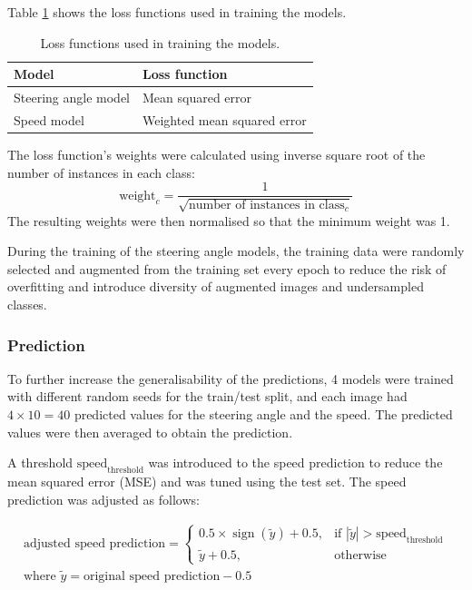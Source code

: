 \documentclass{article}
\begin{document}
Table \ref{tab:loss_functions} shows the loss functions used in training the models.

\begin{table}[h]
  \centering
  \renewcommand{\arraystretch}{1.2}
  \begin{tabular}{|l|l|}
    \hline
    \textbf{Model}       & \textbf{Loss function}      \\
    \hline
    Steering angle model & Mean squared error          \\
    Speed model          & Weighted mean squared error \\
    \hline
  \end{tabular}
  \vspace{0.5em}
  \caption{Loss functions used in training the models.}
  \label{tab:loss_functions}
\end{table}

The loss function's weights were calculated using inverse square root of the number of instances in each class:
\begin{equation}
  \text{weight}_c = \frac{1}{\sqrt{\text{number of instances in class}_c}}
  \label{eq:inverse_square_root}
\end{equation}
The resulting weights were then normalised so that the minimum weight was 1.

During the training of the steering angle models, the training data were randomly selected and augmented from the training set every epoch to reduce the risk of overfitting and introduce diversity of augmented images and undersampled classes.


\subsubsection{Prediction}
To further increase the generalisability of the predictions, 4 models were trained with different random seeds for the train/test split, and each image had \( 4 \times 10 = 40 \) predicted values for the steering angle and the speed. The predicted values were then averaged to obtain the prediction.

A threshold \(\text{speed}_\text{threshold}\) was introduced to the speed prediction to reduce the mean squared error (MSE) and was tuned using the test set. The speed prediction was adjusted as follows:

\begin{equation}
  \begin{aligned}
    \text{adjusted speed prediction} =
    \begin{cases}
      0.5 \times \operatorname{sign}(\tilde{y}) + 0.5, & \text{if } |\tilde{y}| > \text{speed}_\text{threshold} \\
      \tilde{y} + 0.5,                                 & \text{otherwise}
    \end{cases}
    \\
    \text{where } \tilde{y} = \text{original speed prediction} - 0.5
  \end{aligned}
\end{equation}
\end{document}
